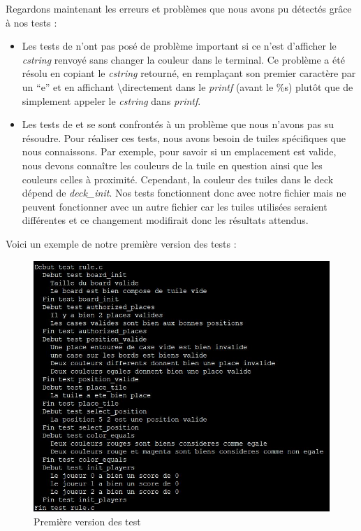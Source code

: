 \documentclass[a4paper]{article}
\begin{document}
Regardons maintenant les erreurs et problèmes que nous avons pu détectés grâce à nos tests : \\
\begin{itemize}
\item Les tests de  n'ont pas posé de problème important si ce n'est d'afficher le \emph{cstring} renvoyé sans changer la couleur dans le terminal. Ce problème a été résolu en copiant le \emph{cstring} retourné, en remplaçant son premier caractère par un ``e'' et en affichant \textbackslash directement dans le \emph{printf} (avant le \%s) plutôt que de simplement appeler le \emph{cstring} dans \emph{printf}.
\item Les tests de  et  se sont confrontés à un problème que nous n'avons pas su résoudre. Pour réaliser ces tests, nous avons besoin de tuiles spécifiques que nous connaissons. Par exemple, pour savoir si un emplacement est valide,  nous devons connaître les couleurs de la tuile en question ainsi que les couleurs celles à proximité. Cependant, la couleur des tuiles dans le deck dépend de \emph{deck\_init}. Nos tests fonctionnent donc avec notre fichier  mais ne peuvent fonctionner avec un autre fichier car les tuiles utilisées seraient différentes et ce changement modifirait donc les résultats attendus. \\
\end{itemize}

Voici un exemple de notre première version des tests :

\begin{figure}[h!]
    \centering
    \includegraphics[scale = 0.75]{testV1.jpg}
  
    \caption{Première version des test}
    \label{testV1}
\end{figure}
\end{document}
